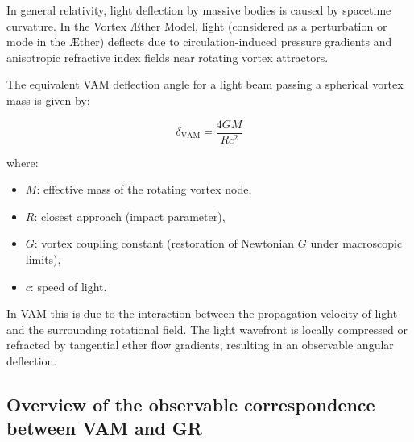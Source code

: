 In general relativity, light deflection by massive bodies is caused by spacetime curvature. In the Vortex Æther Model, light (considered as a perturbation or mode in the Æther) deflects due to circulation-induced pressure gradients and anisotropic refractive index fields near rotating vortex attractors.

The equivalent VAM deflection angle for a light beam passing a spherical vortex mass is given by:

\begin{equation}
    \delta_{\text{VAM}} =
    \frac{4 G M}{R c^2}
\end{equation}

where:
\begin{itemize}
    \item \( M \): effective mass of the rotating vortex node,
    \item \( R \): closest approach (impact parameter),
    \item \( G \): vortex coupling constant (restoration of Newtonian \( G \) under macroscopic limits),
    \item \( c \): speed of light.
\end{itemize}

In VAM this is due to the interaction between the propagation velocity of light and the surrounding rotational field. The light wavefront is locally compressed or refracted by tangential ether flow gradients, resulting in an observable angular deflection.

\subsection*{Overview of the observable correspondence between VAM and GR}

